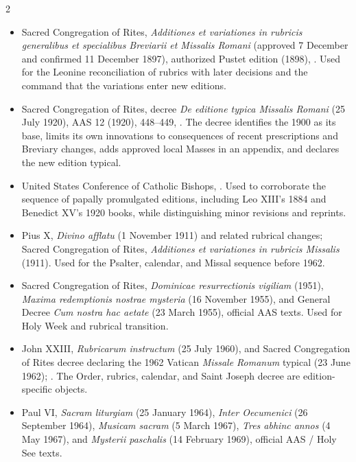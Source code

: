 \begin{multicols}{2}
\begin{itemize}[itemsep=0.12em,topsep=0.15em]
\item Sacred Congregation of Rites, \emph{Additiones et variationes in rubricis generalibus et specialibus Breviarii et Missalis Romani} (approved 7 December and confirmed 11 December 1897), authorized Pustet edition (1898), . Used for the Leonine reconciliation of rubrics with later decisions and the command that the variations enter new editions.
\item Sacred Congregation of Rites, decree \emph{De editione typica Missalis Romani} (25 July 1920), AAS 12 (1920), 448--449, . The decree identifies the 1900  as its base, limits its own innovations to consequences of recent prescriptions and Breviary changes, adds approved local Masses in an appendix, and declares the new edition typical.
\item United States Conference of Catholic Bishops, . Used to corroborate the sequence of papally promulgated editions, including Leo XIII's 1884 and Benedict XV's 1920 books, while distinguishing minor revisions and reprints.
\item Pius X, \emph{Divino afflatu} (1 November 1911) and related rubrical changes; Sacred Congregation of Rites, \emph{Additiones et variationes in rubricis Missalis} (1911). Used for the Psalter, calendar, and Missal sequence before 1962.
\item Sacred Congregation of Rites, \emph{Dominicae resurrectionis vigiliam} (1951), \emph{Maxima redemptionis nostrae mysteria} (16 November 1955), and General Decree \emph{Cum nostra hac aetate} (23 March 1955), official AAS texts. Used for Holy Week and rubrical transition.
\item John XXIII, \emph{Rubricarum instructum} (25 July 1960), and Sacred Congregation of Rites decree declaring the 1962 Vatican \emph{Missale Romanum} typical (23 June 1962); . The Order, rubrics, calendar, and Saint Joseph decree are edition-specific objects.
\item Paul VI, \emph{Sacram liturgiam} (25 January 1964), \emph{Inter Oecumenici} (26 September 1964), \emph{Musicam sacram} (5 March 1967), \emph{Tres abhinc annos} (4 May 1967), and \emph{Mysterii paschalis} (14 February 1969), official AAS / Holy See texts.

\end{itemize}
\end{multicols}
